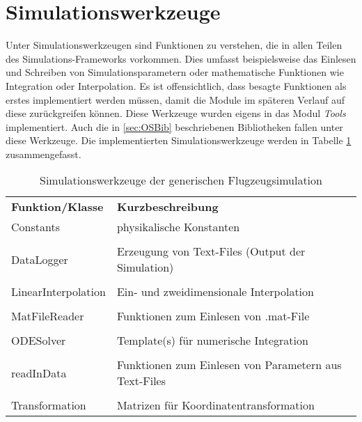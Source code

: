 \section{Simulationswerkzeuge}
Unter Simulationswerkzeugen sind Funktionen zu verstehen, die in allen Teilen des Simulations-Frameworks vorkommen. Dies umfasst beispielsweise das Einlesen und Schreiben von Simulationsparametern oder mathematische Funktionen wie Integration oder Interpolation. Es ist offensichtlich, dass besagte Funktionen als erstes implementiert werden müssen, damit die Module im späteren Verlauf auf diese zurückgreifen können. Diese Werkzeuge wurden eigens in das Modul \textit{Tools} implementiert. Auch die in \ref{sec:OSBib} beschriebenen Bibliotheken fallen unter diese Werkzeuge. Die implementierten Simulationswerkzeuge werden in Tabelle \ref{tab: SimWerk} zusammengefasst.
\begin{table}[h]
\centering	\begin{tabular}{lp{11cm}}
		\textbf{Funktion/Klasse} & \textbf{Kurzbeschreibung}\\
		 Constants & physikalische Konstanten\\\\
		 DataLogger & Erzeugung von Text-Files (Output der Simulation)\\\\
		 LinearInterpolation & Ein- und zweidimensionale Interpolation \\\\
		 MatFileReader & Funktionen zum Einlesen von .mat-File\\\\
		 ODESolver & Template(s) für numerische Integration\\\\
		 readInData & Funktionen zum Einlesen von Parametern aus Text-Files\\\\
		 Transformation & Matrizen für Koordinatentransformation
	\end{tabular}
\caption{Simulationswerkzeuge der generischen Flugzeugsimulation}
\label{tab: SimWerk}
\end{table}
\newpage
